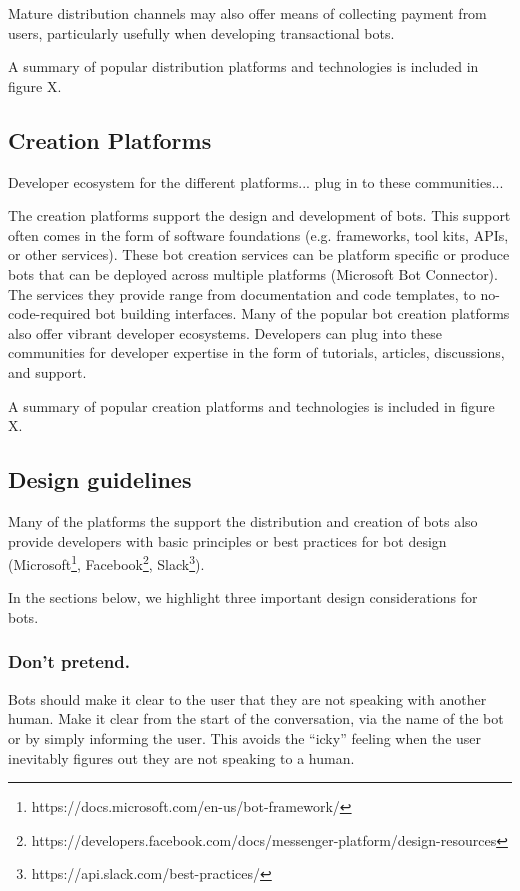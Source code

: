 \documentclass{sig-alternate}
\begin{document}
	Mature distribution channels may also offer means of collecting payment from users, particularly usefully when developing transactional bots.

	A summary of popular distribution platforms and technologies is included in figure X.

	\subsection{Creation Platforms}
	Developer ecosystem for the different platforms...  plug in to these communities...

	The creation platforms support the design and development of bots. This support often comes in the form of software foundations (e.g. frameworks, tool kits, APIs, or other services). These bot creation services can be platform specific or produce bots that can be deployed across multiple platforms (Microsoft Bot Connector). The services they provide range from documentation and code templates, to no-code-required bot building interfaces. 
	Many of the popular bot creation platforms also offer vibrant developer ecosystems. Developers can plug into these communities for developer expertise in the form of tutorials, articles, discussions, and support.

	A summary of popular creation platforms and technologies is included in figure X.

	\subsection{Design guidelines}

	Many of the platforms the support the distribution and creation of bots also provide developers with basic principles or best practices for bot design (Microsoft\footnote{https://docs.microsoft.com/en-us/bot-framework/}, Facebook\footnote{https://developers.facebook.com/docs/messenger-platform/design-resources}, Slack\footnote{https://api.slack.com/best-practices/}).

	In the sections below, we highlight three important design considerations for bots.

	\subsubsection{Don't pretend.}

	Bots should make it clear to the user that they are not speaking with another human.  Make it clear from the start of the conversation, via the name of the bot or by simply informing the user.  This avoids the ``icky'' feeling when the user inevitably figures out they are not speaking to a human.
\end{document}
